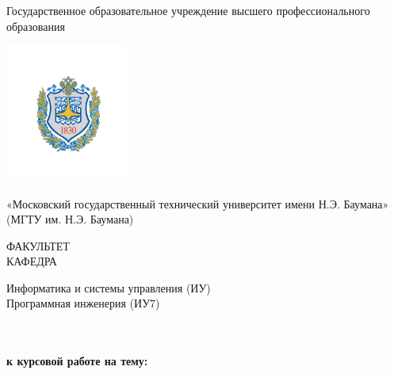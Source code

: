 \begin{titlepage}

\begin{center}
  Государственное образовательное учреждение высшего профессионального образования\\
\end{center}

\begin{minipage}{0.2\textwidth}
  \begin{center}
    \includegraphics[keepaspectratio, width=40.0mm]{bmstu_logo.png}
  \end{center}
\end{minipage}
\begin{minipage}{0.7\textwidth}
  \begin{center}
    «Московский государственный технический университет имени Н.Э. Баумана»\\
	(МГТУ им. Н.Э. Баумана)
  \end{center}
\end{minipage}

\hrulefill

\vfill

\begin{large}
  \begin{minipage}{0.2\textwidth}
    \begin{flushright}
        ФАКУЛЬТЕТ\\
        КАФЕДРА
    \end{flushright}
  \end{minipage}
  \begin{minipage}{0.7\textwidth}
    \begin{center}
      Информатика и системы управления (ИУ)\\
      Программная инженерия (ИУ7)
    \end{center}
  \end{minipage}
\end{large}

\vfill

\begin{center}
   \\
   \\
  \large \bf к курсовой работе на тему:
\end{center}


\end{titlepage}
